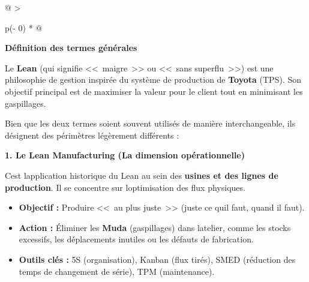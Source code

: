 \documentclass[
]{article}
\begin{document}
\begin{longtable}[]{@{}
  >{\raggedright\arraybackslash}p{(\columnwidth - 0\tabcolsep) * }@{}}
\toprule\noalign{}
\begin{minipage}[b]{\linewidth}\raggedright

\begin{center}
\end{center}

\vspace{0.5em}

\begin{center}
\end{center}

\vspace{1em}

\textbf{Définition des termes générales}

\vspace{0.5em}

Le \textbf{Lean} (qui signifie <<~maigre~>> ou <<~sans superflu~>>) est une philosophie de gestion inspirée du système de production de \textbf{Toyota} (TPS). Son objectif principal est de maximiser la valeur pour le client tout en minimisant les gaspillages.

Bien que les deux termes soient souvent utilisés de manière interchangeable, ils désignent des périmètres légèrement différents :

\textbf{1. Le Lean Manufacturing (La dimension opérationnelle)}

C\textquotesingle est l\textquotesingle application historique du Lean au sein des \textbf{usines et des lignes de production}. Il se concentre sur l\textquotesingle optimisation des flux physiques.

\begin{itemize}
\item \textbf{Objectif :} Produire <<~au plus juste~>> (juste ce qu\textquotesingle il faut, quand il faut).
\item \textbf{Action :} Éliminer les \textbf{Muda} (gaspillages) dans l\textquotesingle atelier, comme les stocks excessifs, les déplacements inutiles ou les défauts de fabrication.
\item \textbf{Outils clés :} 5S (organisation), Kanban (flux tirés), SMED (réduction des temps de changement de série), TPM (maintenance).
\end{itemize}


\end{minipage}
\end{longtable}
\end{document}
